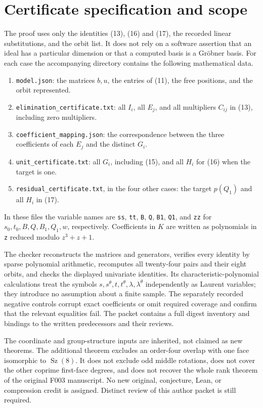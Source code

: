 \documentclass[11pt,a4paper]{article}
\newcommand{\Sz}{\operatorname{Sz}}
\begin{document}
\section*{Certificate specification and scope}

The proof uses only the identities (13), (16) and (17), the recorded
linear substitutions, and the orbit list. It does not rely on a
software assertion that an ideal has a particular dimension or that
a computed basis is a Gr\"obner basis. For each case the accompanying
directory contains the following mathematical data.
\begin{enumerate}
\item \texttt{model.json}: the matrices $b,u$, the entries of (11),
the free positions, and the orbit represented.
\item \texttt{elimination\_certificate.txt}: all $I_i$, all $E_j$,
and all multipliers $C_{ij}$ in (13), including zero multipliers.
\item \texttt{coefficient\_mapping.json}: the correspondence between
the three coefficients of each $E_j$ and the distinct $G_i$.
\item \texttt{unit\_certificate.txt}: all $G_i$, including (15),
and all $H_i$ for (16) when the target is one.
\item \texttt{residual\_certificate.txt}, in the four other cases:
the target $p(Q_1)$ and all $H_i$ in (17).
\end{enumerate}
In these files the variable names are \texttt{ss}, \texttt{tt},
\texttt{B}, \texttt{Q}, \texttt{B1}, \texttt{Q1}, and \texttt{zz}
for $s_0,t_0,B,Q,B_1,Q_1,w$, respectively. Coefficients in $K$ are
written as polynomials in \texttt{z} reduced modulo $z^3+z+1$.

The checker reconstructs the matrices and generators, verifies every
identity by sparse polynomial arithmetic, recomputes all twenty-four
pairs and their eight orbits, and checks the displayed univariate
identities. Its characteristic-polynomial calculations treat the
symbols $s,s^\theta,t,t^\theta,\lambda,\lambda^\theta$ independently
as Laurent variables; they introduce no assumption about a finite
sample. The separately recorded negative controls corrupt exact
coefficients or omit required coverage and confirm that the relevant
equalities fail. The packet contains a full digest inventory and
bindings to the written predecessors and their reviews.

The coordinate and group-structure inputs are inherited, not claimed
as new theorems. The additional theorem excludes an order-four overlap
with one face isomorphic to $\Sz(8)$. It does not exclude odd middle rotations,
does not cover the other coprime first-face degrees, and does not
recover the whole rank theorem of the original F003 manuscript.
No new original, conjecture, Lean, or compression credit is assigned.
Distinct review of this author packet is still required.
\end{document}
